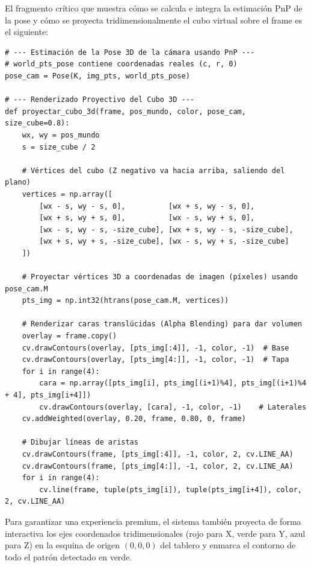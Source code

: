 \documentclass[12pt,a4paper]{article}
\begin{document}
El fragmento crítico que muestra cómo se calcula e integra la estimación PnP de la pose y cómo se proyecta tridimensionalmente el cubo virtual sobre el frame es el siguiente:
\begin{verbatim}
# --- Estimación de la Pose 3D de la cámara usando PnP ---
# world_pts_pose contiene coordenadas reales (c, r, 0)
pose_cam = Pose(K, img_pts, world_pts_pose)

# --- Renderizado Proyectivo del Cubo 3D ---
def proyectar_cubo_3d(frame, pos_mundo, color, pose_cam, size_cube=0.8):
    wx, wy = pos_mundo
    s = size_cube / 2
    
    # Vértices del cubo (Z negativo va hacia arriba, saliendo del plano)
    vertices = np.array([
        [wx - s, wy - s, 0],          [wx + s, wy - s, 0],
        [wx + s, wy + s, 0],          [wx - s, wy + s, 0],
        [wx - s, wy - s, -size_cube], [wx + s, wy - s, -size_cube],
        [wx + s, wy + s, -size_cube], [wx - s, wy + s, -size_cube]
    ])
    
    # Proyectar vértices 3D a coordenadas de imagen (píxeles) usando pose_cam.M
    pts_img = np.int32(htrans(pose_cam.M, vertices))
    
    # Renderizar caras translúcidas (Alpha Blending) para dar volumen
    overlay = frame.copy()
    cv.drawContours(overlay, [pts_img[:4]], -1, color, -1)  # Base
    cv.drawContours(overlay, [pts_img[4:]], -1, color, -1)  # Tapa
    for i in range(4):
        cara = np.array([pts_img[i], pts_img[(i+1)%4], pts_img[(i+1)%4 + 4], pts_img[i+4]])
        cv.drawContours(overlay, [cara], -1, color, -1)    # Laterales
    cv.addWeighted(overlay, 0.20, frame, 0.80, 0, frame)
    
    # Dibujar líneas de aristas
    cv.drawContours(frame, [pts_img[:4]], -1, color, 2, cv.LINE_AA)
    cv.drawContours(frame, [pts_img[4:]], -1, color, 2, cv.LINE_AA)
    for i in range(4):
        cv.line(frame, tuple(pts_img[i]), tuple(pts_img[i+4]), color, 2, cv.LINE_AA)
\end{verbatim}


Para garantizar una experiencia premium, el sistema también proyecta de forma interactiva los ejes coordenados tridimensionales (rojo para X, verde para Y, azul para Z) en la esquina de origen $(0,0,0)$ del tablero y enmarca el contorno de todo el patrón detectado en verde.
\end{document}
